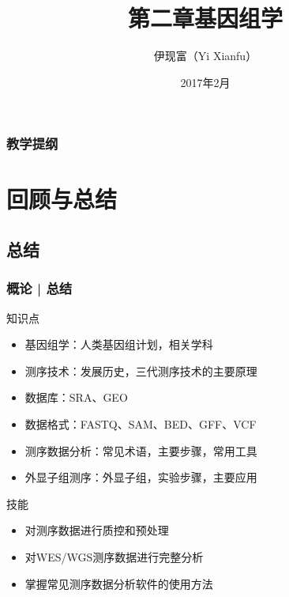 



\title[基因组学]{第二章\quad 基因组学}
\author[Yixf]{伊现富（Yi Xianfu）}
\date{2017年2月}


\begin{frame}[label=current]
  \titlepage
\end{frame}

\begin{frame}[plain,label=current]
  \frametitle{教学提纲}
  \setcounter{tocdepth}{2}
  \begin{multicols}{2}
    \tableofcontents
  \end{multicols}
\end{frame}









\section{回顾与总结}
\subsection{总结}
\begin{frame}
  \frametitle{概论 | 总结}
  \begin{block}{知识点}
    \begin{itemize}
      \item 基因组学：人类基因组计划，相关学科
      \item 测序技术：发展历史，三代测序技术的主要原理
      \item 数据库：SRA、GEO
      \item 数据格式：FASTQ、SAM、BED、GFF、VCF
      \item 测序数据分析：常见术语，主要步骤，常用工具
      \item 外显子组测序：外显子组，实验步骤，主要应用
    \end{itemize}
  \end{block}
  \begin{block}{技能}
    \begin{itemize}
      \item 对测序数据进行质控和预处理
      \item 对WES/WGS测序数据进行完整分析
      \item 掌握常见测序数据分析软件的使用方法
    \end{itemize}
  \end{block}
\end{frame}

